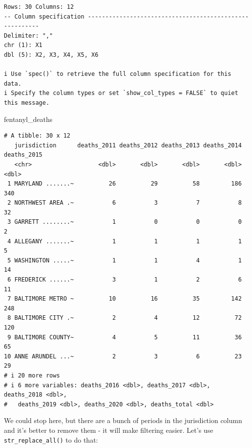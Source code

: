 \documentclass[
  letterpaper,
  DIV=11,
  numbers=noendperiod]{scrreprt}
\newenvironment{Shaded}{\begin{snugshade}}{\end{snugshade}}
\newcommand{\NormalTok}[1]{\textcolor[rgb]{0.00,0.23,0.31}{#1}}
\begin{document}
\begin{verbatim}
Rows: 30 Columns: 12
-- Column specification --------------------------------------------------------
Delimiter: ","
chr (1): X1
dbl (5): X2, X3, X4, X5, X6

i Use `spec()` to retrieve the full column specification for this data.
i Specify the column types or set `show_col_types = FALSE` to quiet this message.
\end{verbatim}

\begin{Shaded}
\begin{Highlighting}[]
\NormalTok{fentanyl\_deaths}
\end{Highlighting}
\end{Shaded}

\begin{verbatim}
# A tibble: 30 x 12
   jurisdiction      deaths_2011 deaths_2012 deaths_2013 deaths_2014 deaths_2015
   <chr>                   <dbl>       <dbl>       <dbl>       <dbl>       <dbl>
 1 MARYLAND .......~          26          29          58         186         340
 2 NORTHWEST AREA .~           6           3           7           8          32
 3 GARRETT ........~           1           0           0           0           2
 4 ALLEGANY .......~           1           1           1           1           5
 5 WASHINGTON .....~           1           1           4           1          14
 6 FREDERICK ......~           3           1           2           6          11
 7 BALTIMORE METRO ~          10          16          35         142         248
 8 BALTIMORE CITY .~           2           4          12          72         120
 9 BALTIMORE COUNTY~           4           5          11          36          65
10 ANNE ARUNDEL ...~           2           3           6          23          29
# i 20 more rows
# i 6 more variables: deaths_2016 <dbl>, deaths_2017 <dbl>, deaths_2018 <dbl>,
#   deaths_2019 <dbl>, deaths_2020 <dbl>, deaths_total <dbl>
\end{verbatim}

We could stop here, but there are a bunch of periods in the jurisdiction
column and it's better to remove them - it will make filtering easier.
Let's use \texttt{str\_replace\_all()} to do that:
\end{document}
